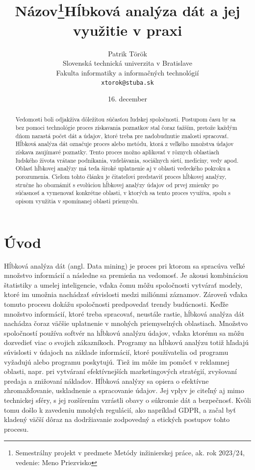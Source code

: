 \documentclass[10pt,twoside,slovak,a4paper]{article}
\title{Názov\thanks{Semestrálny projekt v predmete Metódy inžinierskej práce, ak. rok 2023/24, vedenie: Meno Priezvisko}} %
\title{Hĺbková analýza dát a jej využitie v praxi}
\author{Patrik Török\\[2pt]
	{\small Slovenská technická univerzita v Bratislave}\\
	{\small Fakulta informatiky a informačných technológií}\\
	{\small \texttt{xtorok@stuba.sk}}
	}
\date{\small 16. december }
\begin{document}
\maketitle

\begin{abstract}
Vedomosti boli odjakživa dôležitou súčasťou ľudskej spoločnosti. Postupom času by sa bez pomoci technológie proces získavania poznatkov stal čoraz ťažším, pretože každým dňom narastá počet dát a údajov, ktoré treba pre nadobudnutie znalosti spracovať. Hĺbková analýza dát označuje proces alebo metódu, ktorá z veľkého množstva údajov získava zaujímavé poznatky. Tento proces možno aplikovať v rôznych oblastiach ľudského života vrátane podnikania, vzdelávania, sociálnych sietí, medicíny, vedy apod. Oblasť hĺbkovej analýzy má teda široké uplatnenie aj v oblasti vedeckého pokroku a porozumenia. Cieľom tohto článku je čitateľovi predstaviť proces hĺbkovej analýzy, stručne ho oboznámiť s evolúciou hĺbkovej analýzy údajov od prvej zmienky po súčasnosť a vymenovať konkrétne oblasti, v ktorých sa tento proces využíva, spolu s opisom využitia v spomínanej oblasti priemyslu. 
\end{abstract}



\section{Úvod}
Hĺbková analýza dát (angl. Data mining) je proces pri ktorom sa spracúva veľké množstvo informácií a následne sa premieňa na vedomosť\cite{Iberdola}. Je akousi kombináciou štatistiky a umelej inteligencie, vďaka čomu môžu spoločnosti vytvárať modely, ktoré im umožnia nachádzať súvislosti medzi miliónmi záznamov. Zároveň vďaka tomuto procesu dokážu spoločnosti predpovedať trendy budúcnosti. Keďže množstvo informácií, ktoré treba spracovať, neustále rastie,  hĺbková analýza dát nachádza čoraz väčšie uplatnenie v mnohých priemyselných oblastiach. Množstvo spoločností používa softvér na hĺbkovú analýzu údajov, vďaka ktorému sa môžu dozvedieť viac o svojich zákazníkoch. Programy na hĺbkovú analýzu totiž hľadajú súvislosti v údajoch na základe informácií, ktoré používatelia od programu vyžadujú alebo programu poskytujú. Tiež im môže im pomôcť v reklamnej oblasti, napr. pri vytváraní efektívnejších marketingových stratégií, zvyšovaní predaja a znižovaní nákladov.\cite{Bidgoli:HTM} Hĺbková analýzy sa opiera o efektívne zhromažďovanie, uskladnenie a spracovanie údajov. Jej vplyv je citeľný aj mimo technickej sféry, s jej rozšírením vzrástli obavy o súkromie dát a bezpečnosť. Kvôli tomu došlo k zavedeniu mnohých regulácií, ako napríklad GDPR, a začal byť kladený väčší dôraz na dodržiavanie zodpovedný a etických postupov tohto procesu.
\end{document}
